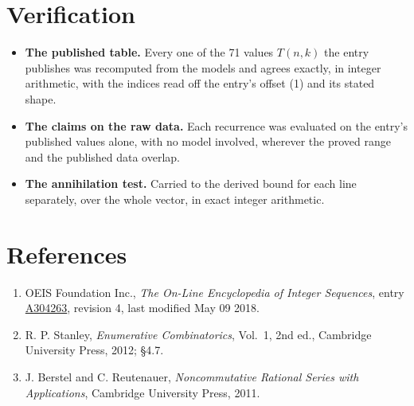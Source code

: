 \documentclass[11pt]{article}
\theoremstyle{definition}
\begin{document}
\section{Verification}

\begin{itemize}

\item {\bfseries The published table.} Every one of the 71 values $T(n,k)$ the entry publishes was recomputed from the models and agrees exactly, in integer arithmetic, with the indices read off the entry's offset (1) and its stated shape.

\item {\bfseries The claims on the raw data.} Each recurrence was evaluated on the entry's published values alone, with no model involved, wherever the proved range and the published data overlap.

\item {\bfseries The annihilation test.} Carried to the derived bound for each line separately, over the whole vector, in exact integer arithmetic.

\end{itemize}

\section{References}

\begin{enumerate}

\item OEIS Foundation Inc., \emph{The On-Line Encyclopedia of Integer Sequences}, entry \href{https://oeis.org/A304263}{A304263}, revision 4, last modified May 09 2018.

\item R. P. Stanley, \emph{Enumerative Combinatorics}, Vol.~1, 2nd ed., Cambridge University Press, 2012; \S4.7.

\item J. Berstel and C. Reutenauer, \emph{Noncommutative Rational Series with Applications}, Cambridge University Press, 2011.

\end{enumerate}
\end{document}
